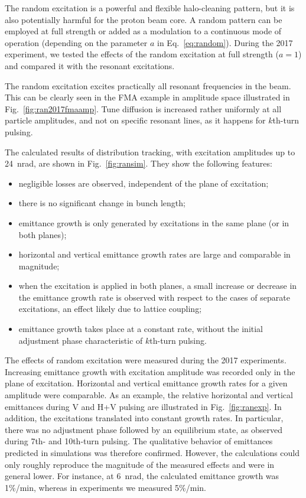 \documentclass[%
 reprint,
 amsmath,amssymb,
 aps,
prstab,
longbibliography
]{revtex4-1}
\newcommand{\kthtp}{$k$th-turn pulsing}
\newcommand{\tenthtp}{10th-turn pulsing}
\begin{document}
The random excitation is a powerful and flexible halo-cleaning
pattern, but it is also potentially harmful for the proton beam
core. A random pattern can be employed at full strength or added as a
modulation to a continuous mode of operation (depending on the
parameter $a$ in Eq.~\ref{eq:random}). During the 2017 experiment, we
tested the effects of the random excitation at full strength ($a = 1$)
and compared it with the resonant excitations.

The random excitation excites practically all resonant frequencies in
the beam.  This can be clearly seen in the FMA example in amplitude
space illustrated in Fig.~\ref{fig:ran2017fmaamp}. Tune diffusion is
increased rather uniformly at all particle amplitudes, and not on
specific resonant lines, as it happens for \kthtp.

The calculated results of distribution tracking, with excitation
amplitudes up to 24~nrad, are shown in
Fig.~\ref{fig:ransim}. They show the following features:
%
\begin{itemize}
\item negligible losses are observed, independent of the plane of
  excitation;
\item there is no significant change in bunch length;
\item emittance growth is only generated by excitations in the same
  plane (or in both planes);
\item horizontal and vertical emittance growth rates are large and
  comparable in magnitude;
\item when the excitation is applied in both planes, a small increase
  or decrease in the emittance growth rate is observed with respect to
  the cases of separate excitations, an effect likely due to lattice
  coupling;
\item emittance growth takes place at a constant rate, without the
  initial adjustment phase characteristic of \kthtp.
\end{itemize}

The effects of random excitation were measured during the 2017
experiments. Increasing emittance growth with excitation amplitude was
recorded only in the plane of excitation. Horizontal and vertical
emittance growth rates for a given amplitude were comparable. As an
example, the relative horizontal and vertical emittances during V and
H+V pulsing are illustrated in Fig.~\ref{fig:ranexp}. In addition, the
excitations translated into constant growth rates. In particular,
there was no adjustment phase followed by an equilibrium state, as
observed during 7th- and \tenthtp. The qualitative behavior of
emittances predicted in simulations was therefore confirmed. However,
the calculations could only roughly reproduce the magnitude of the
measured effects and were in general lower. For instance, at 6~nrad,
the calculated emittance growth was 1\%/min, whereas in experiments we
measured 5\%/min.
\end{document}
